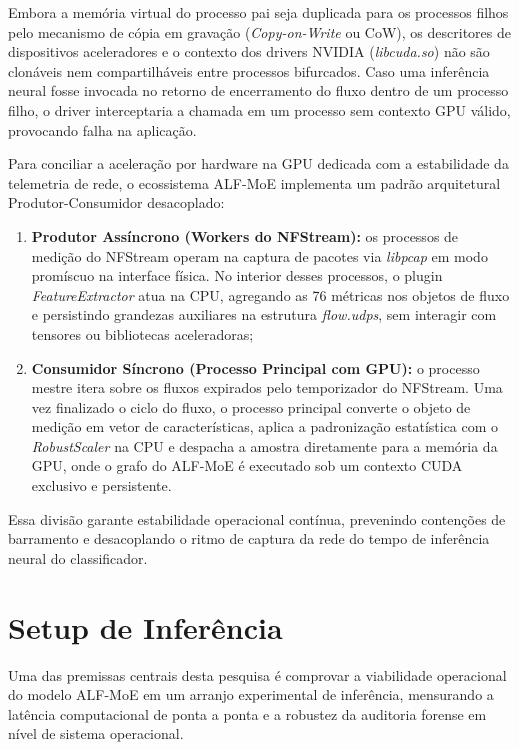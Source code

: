 Embora a memória virtual do processo pai seja duplicada para os processos filhos pelo mecanismo de cópia em gravação
(\emph{Copy-on-Write} ou CoW), os descritores de dispositivos aceleradores e o contexto dos drivers NVIDIA
(\emph{libcuda.so}) não são clonáveis nem compartilháveis entre processos bifurcados. Caso uma inferência neural fosse
invocada no retorno de encerramento do fluxo dentro de um processo filho, o driver interceptaria a chamada em um
processo sem contexto GPU válido, provocando falha na aplicação.

Para conciliar a aceleração por hardware na GPU dedicada com a estabilidade da telemetria de rede, o ecossistema
ALF-MoE implementa um padrão arquitetural Produtor-Consumidor desacoplado:
\begin{enumerate}
    \item \textbf{Produtor Assíncrono (Workers do NFStream):} os processos de medição do NFStream operam na captura de
    pacotes via \emph{libpcap} em modo promíscuo na interface física. No interior desses processos, o plugin
    \emph{FeatureExtractor} atua na CPU, agregando as 76 métricas nos objetos de fluxo e persistindo grandezas
    auxiliares na estrutura \emph{flow.udps}, sem interagir com tensores ou bibliotecas aceleradoras;
    
    \item \textbf{Consumidor Síncrono (Processo Principal com GPU):} o processo mestre itera sobre os fluxos
    expirados pelo temporizador do NFStream. Uma vez finalizado o ciclo do fluxo, o processo principal converte o
    objeto de medição em vetor de características, aplica a padronização estatística com o \emph{RobustScaler} na CPU
    e despacha a amostra diretamente para a memória da GPU, onde o grafo do ALF-MoE é executado sob um contexto CUDA
    exclusivo e persistente.
\end{enumerate}

Essa divisão garante estabilidade operacional contínua, prevenindo contenções de barramento e desacoplando o ritmo de
captura da rede do tempo de inferência neural do classificador.

\section{Setup de Inferência}
\label{sec:setup_inferencia}

Uma das premissas centrais desta pesquisa é comprovar a viabilidade operacional do modelo ALF-MoE em um arranjo 
experimental de inferência, mensurando a latência computacional de ponta a ponta e a robustez da auditoria forense em 
nível de sistema operacional.

